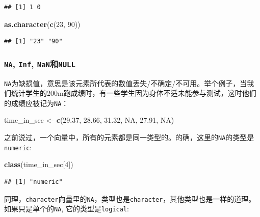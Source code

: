 \documentclass[]{book}
\newenvironment{Shaded}{\begin{snugshade}}{\end{snugshade}}
\newcommand{\DecValTok}[1]{\textcolor[rgb]{0.00,0.00,0.81}{#1}}
\newcommand{\FloatTok}[1]{\textcolor[rgb]{0.00,0.00,0.81}{#1}}
\newcommand{\KeywordTok}[1]{\textcolor[rgb]{0.13,0.29,0.53}{\textbf{#1}}}
\newcommand{\NormalTok}[1]{#1}
\newcommand{\OtherTok}[1]{\textcolor[rgb]{0.56,0.35,0.01}{#1}}
\newcommand{\StringTok}[1]{\textcolor[rgb]{0.31,0.60,0.02}{#1}}
\begin{document}
\begin{verbatim}
## [1] 1 0
\end{verbatim}

\begin{Shaded}
\begin{Highlighting}[]
\KeywordTok{as.character}\NormalTok{(}\KeywordTok{c}\NormalTok{(}\DecValTok{23}\NormalTok{, }\DecValTok{90}\NormalTok{))}
\end{Highlighting}
\end{Shaded}

\begin{verbatim}
## [1] "23" "90"
\end{verbatim}

\hypertarget{na-inf-nannull}{%
\subsubsection{\texorpdfstring{\texttt{NA}, \texttt{Inf}, \texttt{NaN}和\texttt{NULL}}{NA, Inf, NaN和NULL}}\label{na-inf-nannull}}

\texttt{NA}为缺损值，意思是该元素所代表的数值丢失/不确定/不可用。举个例子，当我们统计学生的200m跑成绩时，有一些学生因为身体不适未能参与测试，这时他们的成绩应被记为\texttt{NA}：

\begin{Shaded}
\begin{Highlighting}[]
\NormalTok{time_in_sec <-}\StringTok{ }\KeywordTok{c}\NormalTok{(}\FloatTok{29.37}\NormalTok{, }\FloatTok{28.66}\NormalTok{, }\FloatTok{31.32}\NormalTok{, }\OtherTok{NA}\NormalTok{, }\FloatTok{27.91}\NormalTok{, }\OtherTok{NA}\NormalTok{)}
\end{Highlighting}
\end{Shaded}

之前说过，一个向量中，所有的元素都是同一类型的。的确，这里的\texttt{NA}的类型是\texttt{numeric}:

\begin{Shaded}
\begin{Highlighting}[]
\KeywordTok{class}\NormalTok{(time_in_sec[}\DecValTok{4}\NormalTok{])}
\end{Highlighting}
\end{Shaded}

\begin{verbatim}
## [1] "numeric"
\end{verbatim}

同理，\texttt{character}向量里的\texttt{NA}，类型也是\texttt{character}，其他类型也是一样的道理。如果只是单个的\texttt{NA}, 它的类型是\texttt{logical}:
\end{document}
